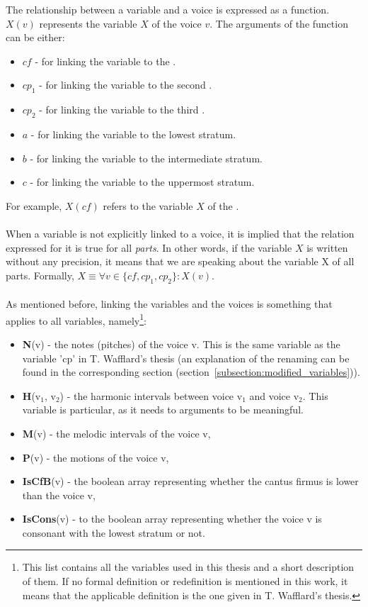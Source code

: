 The relationship between a variable and a voice is expressed as a function. $X(v)$ represents the variable $X$ of the voice $v$. The arguments of the function can be either:
\begin{itemize}
    \item $\mathit{cf}$ - for linking the variable to the \cf.
    \item $cp_1$ - for linking the variable to the second \cp.
    \item $cp_2$ - for linking the variable to the third \cp.
    \item $a$ - for linking the variable to the lowest stratum.
    \item $b$ - for linking the variable to the intermediate stratum.
    \item $c$ - for linking the variable to the uppermost stratum.
  \end{itemize}

\noindent For example, $X(\mathit{cf})$ refers to the variable $X$ of the \cf.

\paragraph{}
When a variable is not explicitly linked to a voice, it is implied that the relation expressed for it is true for all \textit{parts}. In other words, if the variable $X$ is written without any precision, it means that we are speaking about the variable X of all parts. Formally, $X \equiv \forall v \in \{\mathit{cf}, cp_1, cp_2\}: X(v)$.

\paragraph{}
\noindent As mentioned before, linking the variables and the voices is something that applies to all variables, namely\footnote{This list contains all the variables used in this thesis and a short description of them. If no formal definition or redefinition is mentioned in this work, it means that the applicable definition is the one given in T. Wafflard's thesis.}:
\begin{itemize}
    \item \textbf{N}(v) - the notes (pitches) of the voice v. This is the same variable as the variable 'cp' in T. Wafflard's thesis (an explanation of the renaming can be found in the corresponding section (section~\ref{subsection:modified_variables})).
    \item \textbf{H}(v$_1$, v$_2$) - the harmonic intervals between voice v$_1$ and voice v$_2$. This variable is particular, as it needs to arguments to be meaningful.
    \item \textbf{M}(v) - the melodic intervals of the voice v, 
    \item \textbf{P}(v) - the motions of the voice v, 
    \item \textbf{IsCfB}(v) - the boolean array representing whether the cantus firmus is lower than the voice v,
    \item \textbf{IsCons}(v) - to the boolean array representing whether the voice v is consonant with the lowest stratum or not.
\end{itemize}


